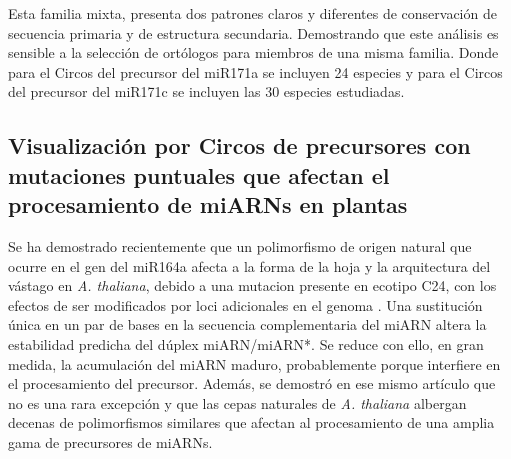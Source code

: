 Esta familia mixta, presenta dos patrones claros y diferentes de conservación de secuencia primaria y de estructura secundaria.
Demostrando que este análisis es sensible a la selección de ortólogos para miembros de una misma familia.
Donde para el Circos del precursor del miR171a se incluyen 24 especies y para el Circos del precursor del miR171c se incluyen las 30 especies estudiadas.



\subsection{Visualización por Circos de precursores con mutaciones puntuales que afectan el procesamiento de miARNs en plantas}

Se ha demostrado recientemente que un polimorfismo de origen natural que ocurre en el gen del miR164a afecta a la forma de la hoja y la arquitectura del vástago en \textit{A. thaliana}, debido a una mutacion presente en ecotipo C24, con los efectos de ser modificados por loci adicionales en el genoma \citep{pmid22206705}.
Una sustitución única en un par de bases en la secuencia complementaria del miARN altera la estabilidad predicha del dúplex miARN/miARN*.
Se reduce con ello, en gran medida, la acumulación del miARN maduro, probablemente porque interfiere en el procesamiento del precursor.
Además, se demostró en ese mismo artículo que no es una rara excepción y que las cepas naturales de \textit{A. thaliana} albergan decenas de polimorfismos similares que afectan al procesamiento de una amplia gama de precursores de miARNs.

